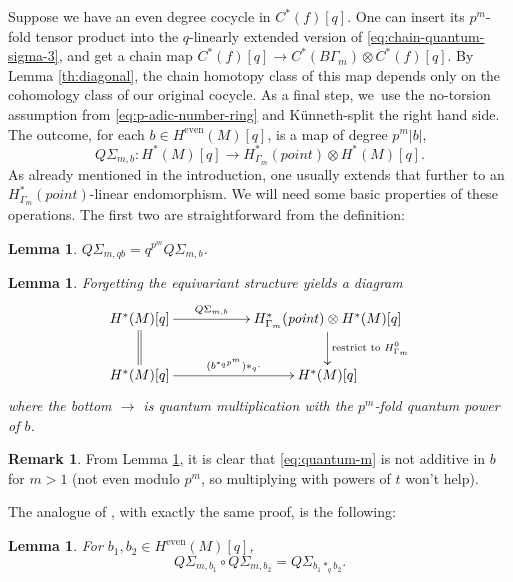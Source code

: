 \documentclass[10pt,a4paper]{amsart}
\theoremstyle{plain}
\newtheorem{lemma}[theorem]{Lemma}
\theoremstyle{definition}
\newtheorem{remark}[theorem]{Remark}
\begin{document}
Suppose we have an even degree cocycle in $C^*(f)[q]$. One can insert its $p^m$-fold tensor product into the $q$-linearly extended version of \eqref{eq:chain-quantum-sigma-3}, and get a chain map $C^*(f)[q] \to C^*(B\Gamma_m) \otimes C^*(f)[q]$. By Lemma \ref{th:diagonal}, the chain homotopy class of this map depends only on the cohomology class of our original cocycle. As a final step, we~use the no-torsion assumption from \eqref{eq:p-adic-number-ring} and Künneth-split the right hand side. The outcome, for each $b \in H^{\mathrm{even}}(M)[q]$, is a map of degree $p^m|b|$,
\begin{equation}\label{eq:quantum-mb}
Q\Sigma_{m,b}: H^*(M)[q] \to H^*_{\Gamma_m}(\mathit{point}) \otimes H^*(M)[q].
\end{equation}
As already mentioned in the introduction, one usually extends that further to an $H^*_{\Gamma_m}(\mathit{point})$-linear endomorphism. We will need some basic properties of these operations. The first two are straightforward from the definition:

\begin{lemma} \label{th:q-frobenius}
$Q\Sigma_{m,qb} = q^{p^m} Q\Sigma_{m,b}$.
\end{lemma}

\begin{lemma} \label{th:non-equivariant}
Forgetting the equivariant structure yields a diagram
\begin{equation*}
\xymatrix{
H^*(M)[q] \ar@{=}[d] \ar[rr]^-{Q\Sigma_{m,b}} &&
H^*_{\Gamma_m}(\mathit{point}) \otimes H^*(M)[q] \ar[d]^-{\text{restrict to $H^0_{\Gamma_m}$}} \\
H^*(M)[q] \ar[rr]^-{(b^{\ast_q p^m}) \ast_q \cdot} && H^*(M)[q]
}
\end{equation*}
where the bottom $\to$ is quantum multiplication with the $p^m$-fold quantum power of $b$.
\end{lemma}

\begin{remark} \label{th:not-additive}
From Lemma \ref{th:non-equivariant}, it is clear that \eqref{eq:quantum-m} is not additive in $b$ for $m>1$ (not even modulo $p^m$, so multiplying with powers of $t$ won't help).
\end{remark}

The analogue of \cite[Prop.\,4.8]{seidel-wilkins21}, with exactly the same proof, is the following:

\begin{lemma} \label{th:composition}
For $b_1,b_2 \in H^{\mathrm{even}}(M)[q]$,
\begin{equation*}
Q\Sigma_{m,b_1} \circ Q\Sigma_{m,b_2} = Q\Sigma_{b_1 \ast_q b_2}.
\end{equation*}
\end{lemma}
\end{document}
